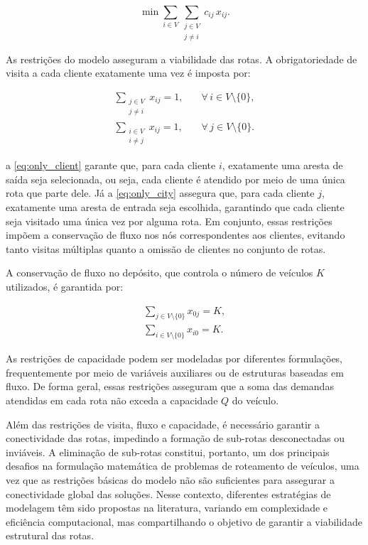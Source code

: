 \begin{equation}
    \min \sum_{i \in V} \sum_{\substack{j \in V \\ j \neq i}} c_{ij}\, x_{ij}.
\end{equation}

As restrições do modelo asseguram a viabilidade das rotas. A obrigatoriedade de visita a cada cliente exatamente uma vez é imposta por:

\begin{eqnarray}
\sum_{\substack{j \in V \\ j \neq i}} x_{ij} = 1, & \quad \forall\, i \in V \setminus \{0\}, \label{eq:only_client}\\[4pt]
\sum_{\substack{i \in V \\ i \neq j}} x_{ij} = 1, & \quad \forall\, j \in V \setminus \{0\}. \label{eq:only_city}
\end{eqnarray}

\noindent a \autoref{eq:only_client} garante que, para cada cliente $i$, exatamente uma aresta de saída seja selecionada, ou seja, cada cliente é atendido por meio de uma única rota que parte dele. Já a \autoref{eq:only_city} assegura que, para cada cliente $j$, exatamente uma aresta de entrada seja escolhida, garantindo que cada cliente seja visitado uma única vez por alguma rota. Em conjunto, essas restrições impõem a conservação de fluxo nos nós correspondentes aos clientes, evitando tanto visitas múltiplas quanto a omissão de clientes no conjunto de rotas. 

A conservação de fluxo no depósito, que controla o número de veículos $K$ utilizados, é garantida por:

\begin{eqnarray}
\sum_{j \in V \setminus \{0\}} x_{0j} = K, \\[4pt]
\sum_{i \in V \setminus \{0\}} x_{i0} = K.
\end{eqnarray}

As restrições de capacidade podem ser modeladas por diferentes formulações, frequentemente por meio de variáveis auxiliares ou de estruturas baseadas em fluxo. De forma geral, essas restrições asseguram que a soma das demandas atendidas em cada rota não exceda a capacidade $Q$ do veículo.

Além das restrições de visita, fluxo e capacidade, é necessário garantir a conectividade das rotas, impedindo a formação de sub-rotas desconectadas ou inviáveis. A eliminação de sub-rotas constitui, portanto, um dos principais desafios na formulação matemática de problemas de roteamento de veículos, uma vez que as restrições básicas do modelo não são suficientes para assegurar a conectividade global das soluções. Nesse contexto, diferentes estratégias de modelagem têm sido propostas na literatura, variando em complexidade e eficiência computacional, mas compartilhando o objetivo de garantir a viabilidade estrutural das rotas.

